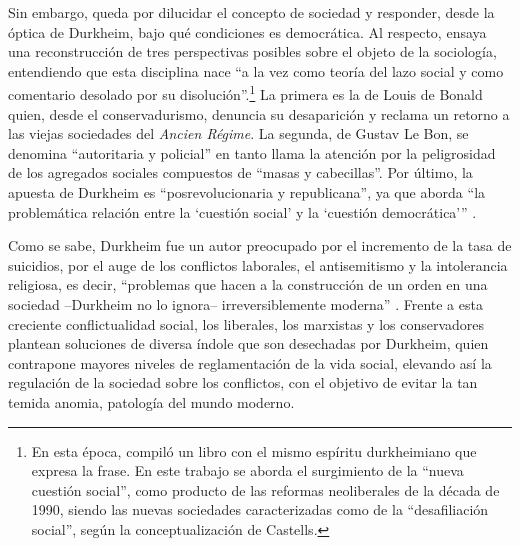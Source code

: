 Sin embargo, queda por dilucidar el concepto de sociedad y responder, desde la óptica de Durkheim, bajo qué condiciones es democrática. Al respecto, \textcite[21]{1592-DEIPOLA1997} ensaya una reconstrucción de tres perspectivas posibles sobre el objeto de la sociología, entendiendo que esta disciplina nace \enquote{a la vez como teoría del lazo social y como comentario desolado por su disolución}.\footnote{En esta época, \textcite{1609-DEIPOLA1998} compiló un libro con el mismo espíritu durkheimiano que expresa la frase. En este trabajo se aborda el surgimiento de la \enquote{nueva cuestión social}, como producto de las reformas neoliberales de la década de 1990, siendo las nuevas sociedades caracterizadas como de la \enquote{desafiliación social}, según la conceptualización de Castells.} La primera es la de Louis de Bonald quien, desde el conservadurismo, denuncia su desaparición y reclama un retorno a las viejas sociedades del \emph{Ancien Régime}. La segunda, de Gustav Le Bon, se denomina \enquote{autoritaria y policial} en tanto llama la atención por la peligrosidad de los agregados sociales compuestos de \enquote{masas y cabecillas}. Por último, la apuesta de Durkheim es \enquote{posrevolucionaria y republicana}, ya que aborda \enquote{la problemática relación entre la \enquote{cuestión social} y la \enquote{cuestión democrática}} \parencite[36]{1592-DEIPOLA1997}.

Como se sabe, Durkheim fue un autor preocupado por el incremento de la tasa de suicidios, por el auge de los conflictos laborales, el antisemitismo y la intolerancia religiosa, es decir, \enquote{problemas que hacen a la construcción de un orden en una sociedad --Durkheim no lo ignora-- irreversiblemente moderna} \parencite[36]{1592-DEIPOLA1997}. Frente a esta creciente conflictualidad social, los liberales, los marxistas y los conservadores plantean soluciones de diversa índole que son desechadas por Durkheim, quien contrapone mayores niveles de reglamentación de la vida social, elevando así la regulación de la sociedad sobre los conflictos, con el objetivo de evitar la tan temida anomia, patología del mundo moderno.

